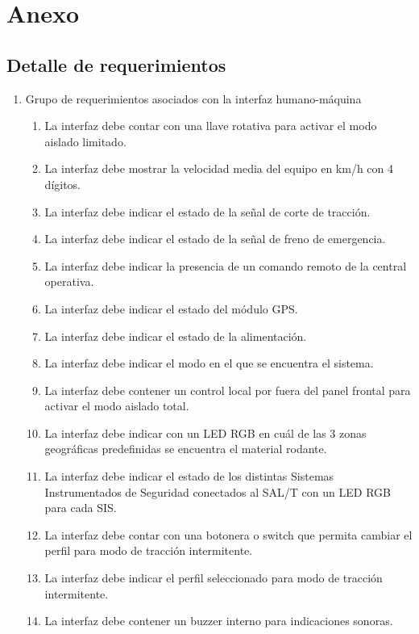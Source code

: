 \section{Anexo}\label{anexo}

\subsection{Detalle de requerimientos}

\begin{enumerate}
    \item Grupo de requerimientos asociados con la interfaz humano-máquina
    \begin{enumerate}
        \item La interfaz debe contar con una llave rotativa para activar el modo aislado limitado.
        \item La interfaz debe mostrar la velocidad media del equipo en km/h con 4 dígitos.
        \item La interfaz debe indicar el estado de la señal de corte de tracción.
        \item La interfaz debe indicar el estado de la señal de freno de emergencia.
        \item La interfaz debe indicar la presencia de un comando remoto de la central operativa.
        \item La interfaz debe indicar el estado del módulo GPS.
        \item La interfaz debe indicar el estado de la alimentación.
        \item La interfaz debe indicar el modo en el que se encuentra el sistema.
        \item La interfaz debe contener un control local por fuera del panel frontal para activar el modo aislado total.
        \item La interfaz debe indicar con un LED RGB en cuál de las 3 zonas geográficas predefinidas se encuentra el material rodante. 
        \item La interfaz debe indicar el estado de los distintas Sistemas Instrumentados de Seguridad conectados al SAL/T con un LED RGB para cada SIS.
        \item La interfaz debe contar con una botonera o switch que permita cambiar el perfil para modo de tracción intermitente.
        \item La interfaz debe indicar el perfil seleccionado para modo de tracción intermitente.
        \item La interfaz debe contener un buzzer interno para indicaciones sonoras.
    \end{enumerate}
       

\end{enumerate}
